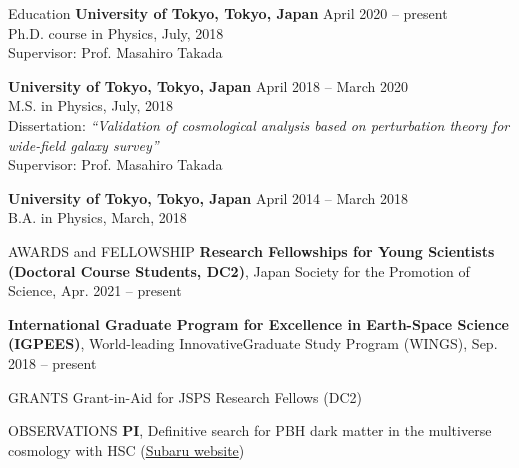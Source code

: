 \documentclass{resume} %
\begin{document}
\begin{rSection}{Education}
{\bf University of Tokyo, Tokyo, Japan}  \hfill {April 2020 -- present}\\
Ph.D. course in Physics, July, 2018\\
Supervisor: Prof. Masahiro Takada

{\bf University of Tokyo, Tokyo, Japan}  \hfill {April 2018 -- March 2020}\\
M.S. in Physics, July, 2018\\
Dissertation: \textit{``Validation of cosmological analysis based on perturbation theory for wide-field galaxy survey''} \\
Supervisor: Prof. Masahiro Takada

{\bf University of Tokyo, Tokyo, Japan}  \hfill {April 2014 -- March 2018}\\
B.A. in Physics, March, 2018

\end{rSection}


\begin{rSection}{AWARDS and FELLOWSHIP}
    \textbf{Research Fellowships for Young Scientists (Doctoral Course Students, DC2)}, Japan Society for the Promotion of Science, Apr. 2021 -- present

    \textbf{International Graduate Program for Excellence in Earth-Space Science (IGPEES)}, World-leading InnovativeGraduate Study Program (WINGS), Sep. 2018 -- present
\end{rSection}


\begin{rSection}{GRANTS}
    Grant-in-Aid for JSPS Research Fellows (DC2)
\end{rSection}

\begin{rSection}{OBSERVATIONS}
    \textbf{PI}, Definitive search for PBH dark matter in the multiverse cosmology with HSC (\href{https://subarutelescope.org/Observing/Schedule/S20B_abstract/S20B0032abst.html}{Subaru website})
\end{rSection}
\end{document}
